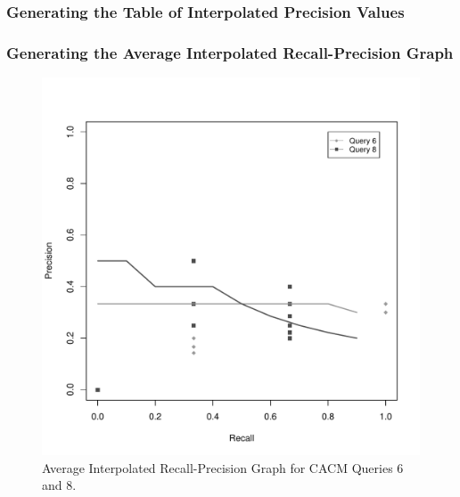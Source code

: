\subsubsection{Generating the Table of Interpolated Precision Values}



\subsubsection{Generating the Average Interpolated Recall-Precision Graph}

\begin{figure}[H]
\centering
\label{fig:aiprgraph68}
\includegraphics[scale=.6]{code/getrel/ipr68.pdf}
\caption{Average Interpolated Recall-Precision Graph for CACM Queries 6 and 8.}
\end{figure}




